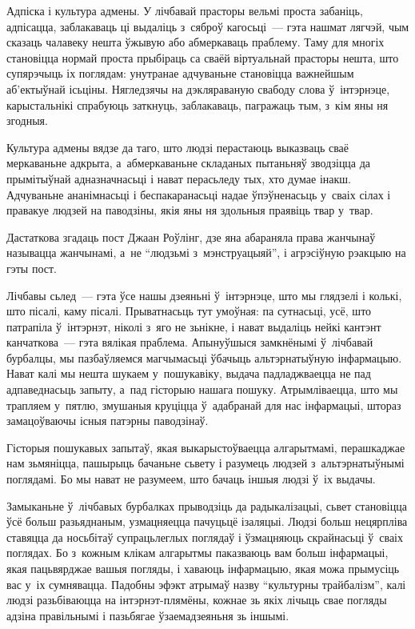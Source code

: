 Адпіска і культура адмены. У лічбавай прасторы вельмі проста забаніць, адпісацца, заблакаваць ці выдаліць з~сяброў кагосьці~--- гэта нашмат лягчэй, чым сказаць чалавеку нешта ўжывую або абмеркаваць праблему. Таму для многіх становіцца нормай проста прыбіраць са сваёй віртуальнай прасторы нешта, што супярэчыць іх поглядам: унутранае адчуваньне становіцца важнейшым аб'ектыўнай ісьціны. Нягледзячы на дэкляраваную свабоду слова ў~інтэрнэце, карыстальнікі спрабуюць заткнуць, заблакаваць, пагражаць тым, з~кім яны ня згодныя.

Культура адмены вядзе да таго, што людзі перастаюць выказваць сваё меркаваньне адкрыта, а~абмеркаваньне складаных пытаньняў зводзіцца да прымітыўнай адназначнасьці і нават перасьледу тых, хто думае інакш. Адчуваньне ананімнасьці і беспакаранасьці надае ўпэўненасьць у~сваіх сілах і правакуе людзей на паводзіны, якія яны ня здольныя праявіць твар у~твар.

Дастаткова згадаць пост Джаан Роўлінг, дзе яна абараняла права жанчынаў называцца жанчынамі, а~не ``людзьмі з~мэнструацыяй'', і агрэсіўную рэакцыю на гэты пост.

Лічбавы сьлед~--- гэта ўсе нашы дзеяньні ў~інтэрнэце, што мы глядзелі і колькі, што пісалі, каму пісалі. Прыватнасьць тут умоўная: па сутнасьці, усё, што патрапіла ў~інтэрнэт, ніколі з~яго не зьнікне, і нават выдаліць нейкі кантэнт канчаткова~--- гэта вялікая праблема. Апынуўшыся замкнёнымі ў~лічбавай бурбалцы, мы пазбаўляемся магчымасьці ўбачыць альтэрнатыўную інфармацыю. Нават калі мы нешта шукаем у~пошукавіку, выдача падладжваецца не пад адпаведнасьць запыту, а~пад гісторыю нашага пошуку. Атрымліваецца, што мы трапляем у~пятлю, змушаныя круціцца ў~адабранай для нас інфармацыі, штораз замацоўваючы існыя патэрны паводзінаў. 

Гісторыя пошукавых запытаў, якая выкарыстоўваецца алгарытмамі, перашкаджае нам зьмяніцца, пашырыць бачаньне сьвету і разумець людзей з~альтэрнатыўнымі поглядамі. Бо мы нават не разумеем, што бачаць іншыя людзі ў~іх выдачы.

Замыканьне ў~лічбавых бурбалках прыводзіць да радыкалізацыі, сьвет становіцца ўсё больш разьяднаным, узмацняецца пачуцьцё ізаляцыі. Людзі больш нецярпліва ставяцца да носьбітаў супрацьлеглых поглядаў і ўзмацняюць скрайнасьці ў~сваіх поглядах. Бо з~кожным клікам алгарытмы паказваюць вам больш інфармацыі, якая пацьвярджае вашыя погляды, і хаваюць інфармацыю, якая можа прымусіць вас у~іх сумнявацца. Падобны эфэкт атрымаў назву ``культурны трайбалізм'', калі людзі разьбіваюцца на інтэрнэт-плямёны, кожнае зь якіх лічыць свае погляды адзіна правільнымі і пазьбягае ўзаемадзеяньня зь іншымі.

